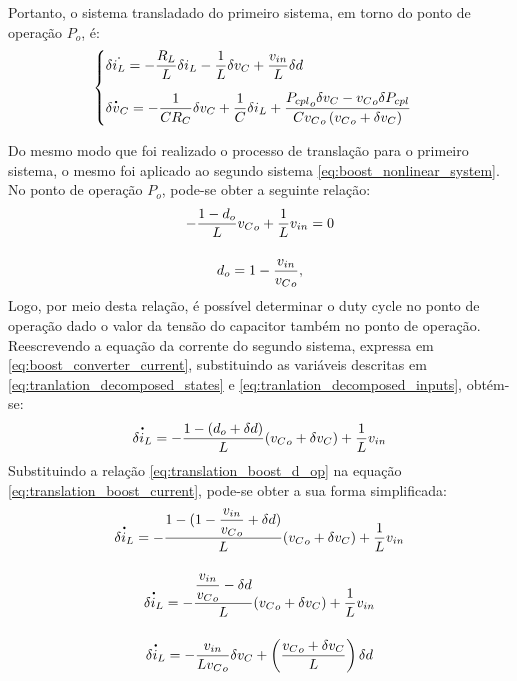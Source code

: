 Portanto, o sistema transladado do primeiro sistema, em torno do ponto de operação $P_o$, é: \begin{equation}
  \begin{cases}
    \displaystyle \delta \dot{i_L} = - \frac{R_L}{L} \delta i_L - \frac{1}{L} \delta v_C  + \frac{v_{in}}{L} \delta d \\[12pt]
    \displaystyle \delta \dt{v}_C = - \frac{1}{C R_C} \delta v_C  + \frac{1}{C}  \delta i_L + \frac{{P_{cpl}}_o \delta v_C - {v_C}_o \delta P_{cpl}}{C {v_C}_o \left({v_C}_o + \delta v_C\right)}
  \end{cases}
\end{equation}

Do mesmo modo que foi realizado o processo de translação para o primeiro sistema, o mesmo foi aplicado ao segundo sistema \eqref{eq:boost_nonlinear_system}. No ponto de operação $P_o$, pode-se obter a seguinte relação: \begin{gather}
  - \frac{1 - d_o}{L}{v_C}_o + \frac{1}{L}v_{in} = 0 \notag \\[12pt]
  {d}_o = 1 - \frac{v_{in}}{{v_C}_o} \label{eq:translation_boost_d_op},
\end{gather} Logo, por meio desta relação, é possível determinar o duty cycle no ponto de operação dado o valor da tensão do capacitor também no ponto de operação. Reescrevendo a equação da corrente do segundo sistema, expressa em \eqref{eq:boost_converter_current}, substituindo as variáveis descritas em \eqref{eq:tranlation_decomposed_states} e \eqref{eq:tranlation_decomposed_inputs}, obtém-se: \begin{gather}
  \dt{\delta i_L}  = - \frac{1 - (d_o + \delta d) }{L} ({v_C}_o + \delta v_C) + \frac{1}{L} v_{in} \label{eq:translation_boost_current}
\end{gather} Substituindo a relação \eqref{eq:translation_boost_d_op} na equação \eqref{eq:translation_boost_current}, pode-se obter a sua forma simplificada: \begin{gather}
  \dt{\delta i_L}  = - \frac{1 - (1 - \displaystyle \frac{v_{in}}{{v_C}_o} + \delta d) }{L} ({v_C}_o + \delta v_C) + \frac{1}{L} v_{in} \notag  \\[12pt]
  \dt{\delta i_L}  = - \frac{\displaystyle \frac{v_{in}}{{v_C}_o} - \delta d }{L} ({v_C}_o + \delta v_C) + \frac{1}{L} v_{in} \notag  \\[12pt]
  \dt{\delta i_L}  = - \frac{v_{in}}{L{v_C}_o}\delta v_C + \left(\frac{{v_C}_o + \delta {v_C}}{L}\right) \delta d
\end{gather}


